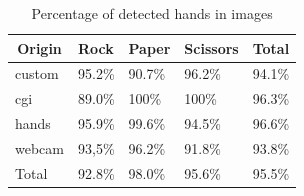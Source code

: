 \documentclass[a4paper]{article}
\begin{document}
\begin{table}
\label{tbl:img-hands_percentage}
\caption{Percentage of detected hands in images}
\centering
\begin{tabular}{@{}lllll@{}}
\toprule
\multicolumn{1}{c}{Origin} & Rock   & Paper  & Scissors & Total  \\ \midrule
custom                     & 95.2\% & 90.7\% & 96.2\%   & 94.1\% \\
cgi                        & 89.0\% & 100\%  & 100\%    & 96.3\% \\
hands                      & 95.9\% & 99.6\% & 94.5\%   & 96.6\% \\
webcam                     & 93,5\% & 96.2\% & 91.8\%   & 93.8\% \\
Total                      & 92.8\% & 98.0\% & 95.6\%   & 95.5\% \\ \bottomrule
\end{tabular}
\end{table}
\end{document}
